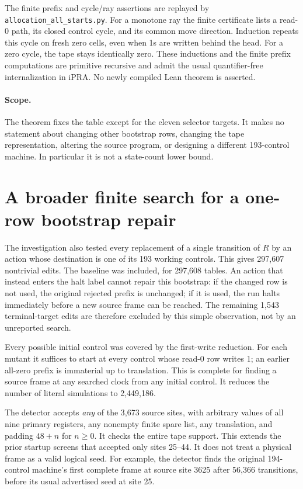 The finite prefix and cycle/ray assertions are replayed by
\texttt{allocation\_all\_starts.py}.  For a monotone ray the finite
certificate lists a read-0 path, its closed control cycle, and its common
move direction.  Induction repeats this cycle on fresh zero cells, even
when 1s are written behind the head.  For a zero cycle, the tape stays
identically zero.  These inductions and the finite prefix computations are
primitive recursive and admit the usual quantifier-free internalization in
\(\mathrm{iPRA}\).  No newly compiled Lean theorem is asserted.

\paragraph{Scope.}
The theorem fixes the table except for the eleven selector targets.  It
makes no statement about changing other bootstrap rows, changing the tape
representation, altering the source program, or designing a different
193-control machine.  In particular it is not a state-count lower bound.

\section{A broader finite search for a one-row bootstrap repair}

The investigation also tested every replacement of a single transition of
$R$ by an action whose destination is one of its 193 working controls.
This gives 297,607 nontrivial edits.  The baseline was included, for 297,608
tables.  An action that instead enters the halt label cannot repair this
bootstrap: if the changed row is not used, the original rejected prefix is
unchanged; if it is used, the run halts immediately before a new source
frame can be reached.  The remaining 1,543 terminal-target edits are
therefore excluded by this simple observation, not by an unreported search.

Every possible initial control was covered by the first-write reduction.
For each mutant it suffices to start at every control whose read-0 row
writes 1; an earlier all-zero prefix is immaterial up to translation.  This
is complete for finding a source frame at any searched clock from any
initial control.  It reduces the number of literal simulations to
2,449,186.

The detector accepts \emph{any} of the 3,673 source sites, with arbitrary
values of all nine primary registers, any nonempty finite spare list,
any translation, and padding $48+n$ for $n\geq0$.  It checks the entire tape
support.  This extends the prior startup screens that accepted only sites
25--44.  It does not treat a physical frame as a valid logical seed.
For example, the detector finds the original 194-control machine's first
complete frame at source site 3625 after 56,366 transitions, before its
usual advertised seed at site 25.


